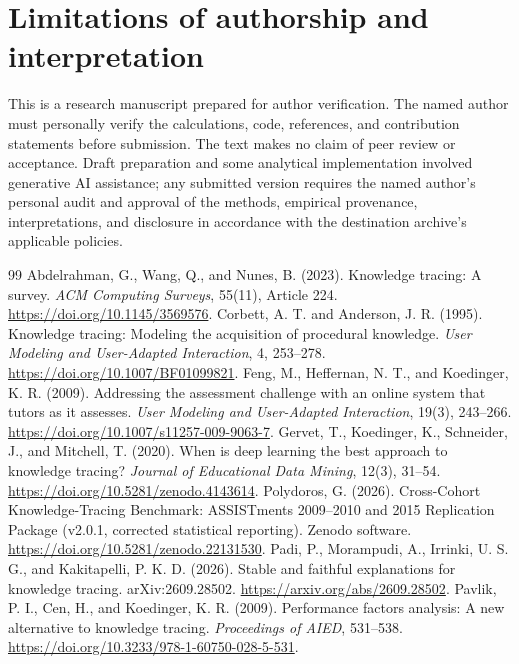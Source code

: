 \documentclass[11pt,a4paper]{article}
\begin{document}
\section*{Limitations of authorship and interpretation}
This is a research manuscript prepared for author verification. The named author must personally verify the calculations, code, references, and contribution statements before submission. The text makes no claim of peer review or acceptance. Draft preparation and some analytical implementation involved generative AI assistance; any submitted version requires the named author's personal audit and approval of the methods, empirical provenance, interpretations, and disclosure in accordance with the destination archive's applicable policies.

\begingroup\small
\setlength{\itemsep}{0pt}
\begin{thebibliography}{99}
 Abdelrahman, G., Wang, Q., and Nunes, B. (2023). Knowledge tracing: A survey. \emph{ACM Computing Surveys}, 55(11), Article 224. \url{https://doi.org/10.1145/3569576}.
 Corbett, A. T. and Anderson, J. R. (1995). Knowledge tracing: Modeling the acquisition of procedural knowledge. \emph{User Modeling and User-Adapted Interaction}, 4, 253--278. \url{https://doi.org/10.1007/BF01099821}.
 Feng, M., Heffernan, N. T., and Koedinger, K. R. (2009). Addressing the assessment challenge with an online system that tutors as it assesses. \emph{User Modeling and User-Adapted Interaction}, 19(3), 243--266. \url{https://doi.org/10.1007/s11257-009-9063-7}.
 Gervet, T., Koedinger, K., Schneider, J., and Mitchell, T. (2020). When is deep learning the best approach to knowledge tracing? \emph{Journal of Educational Data Mining}, 12(3), 31--54. \url{https://doi.org/10.5281/zenodo.4143614}.
 Polydoros, G. (2026). Cross-Cohort Knowledge-Tracing Benchmark: ASSISTments 2009--2010 and 2015 Replication Package (v2.0.1, corrected statistical reporting). Zenodo software. \url{https://doi.org/10.5281/zenodo.22131530}.
 Padi, P., Morampudi, A., Irrinki, U. S. G., and Kakitapelli, P. K. D. (2026). Stable and faithful explanations for knowledge tracing. arXiv:2609.28502. \url{https://arxiv.org/abs/2609.28502}.
 Pavlik, P. I., Cen, H., and Koedinger, K. R. (2009). Performance factors analysis: A new alternative to knowledge tracing. \emph{Proceedings of AIED}, 531--538. \url{https://doi.org/10.3233/978-1-60750-028-5-531}.

\end{thebibliography}
\end{document}
